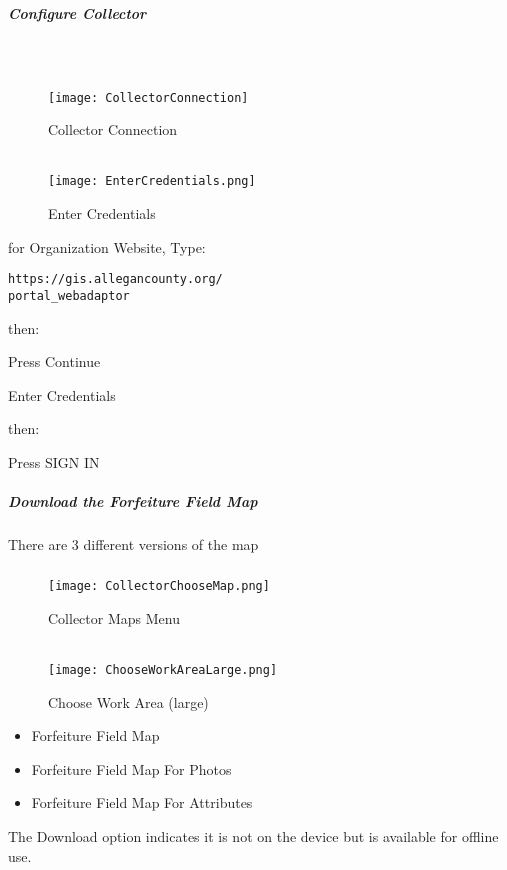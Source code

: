 \documentclass[class=article , crop=false, titlepage, twoside, multi={itemize, figure, verbatim}, float=false]{standalone}
\begin{document}
\clearpage
\subparagraph[Configure Collector]{\Large Configure Collector}

\subparagraph*{\texorpdfstring{\\}{}}
\begin{wrapfigure}{r}{0.5\textwidth}
\centering
\texttt{[image: CollectorConnection]}
\caption{Collector Connection}
\vspace{.25in}
\HRule \\[.4cm] %
\vspace{.25in}
\texttt{[image: EnterCredentials.png]}
\caption{Enter Credentials}
\end{wrapfigure}
for Organization Website, Type:
\vspace{.5in}

\begin{verbatim}
https://gis.allegancounty.org/
portal_webadaptor

\end{verbatim}
\large then:
\vspace{.5in}

Press \Large Continue
\vspace{2in}

\noindent Enter Credentials
\vspace{.5in}

\large then:
\vspace{.5in}

Press \Large SIGN IN
\clearpage
\subparagraph{Download the Forfeiture Field Map\texorpdfstring{\\}{}}
\noindent There are 3 different versions of the map
\subparagraph*{}
\begin{wrapfigure}{r}{0.5\textwidth}
\centering
\texttt{[image: CollectorChooseMap.png]}
\caption{Collector Maps Menu}
\vspace{.25in}
\HRule \\[.4cm] %
\vspace{.25in}
\texttt{[image: ChooseWorkAreaLarge.png]}
\caption{Choose Work Area (large)}
\end{wrapfigure}
\begin{itemize}
\item Forfeiture Field Map
\item Forfeiture Field Map For Photos
\item Forfeiture Field Map For Attributes
\end{itemize}
\footnotesize The Download option indicates it is not on the device but is available for offline use.
\vspace{.5in}
\end{document}
